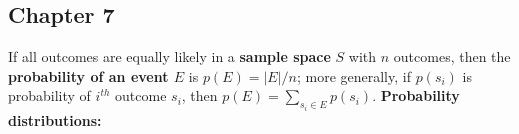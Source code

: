 \documentclass[12pt]{article}
\begin{document}
\subsection{Chapter 7} 
If all outcomes are equally likely in a \textbf{sample space} $S$ with $n$ outcomes, then the \textbf{probability of an event $E$} is $p(E) =|E|/n$; more generally, if $p(s_i)$ is probability of $i^{th}$ outcome $s_i$, then $p(E) = \sum_{s_i \in E} p(s_i)$.
\textbf{Probability distributions: }
\end{document}
